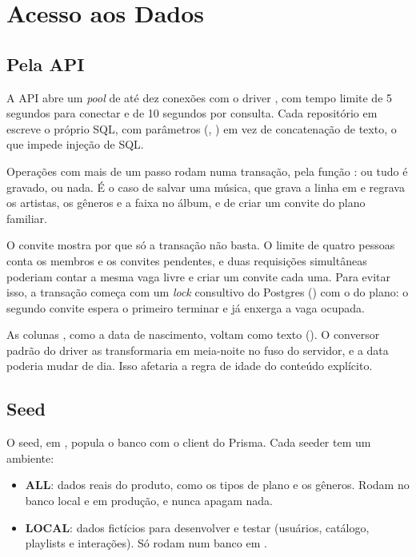 \section{Acesso aos Dados}
\label{sec:acesso}

\subsection{Pela API}

A API abre um \emph{pool} de até dez conexões com o driver , com
tempo limite de 5 segundos para conectar e de 10 segundos por
consulta. Cada repositório em  escreve o próprio SQL,
com parâmetros (, ) em vez de concatenação de texto, o
que impede injeção de SQL.

Operações com mais de um passo rodam numa transação, pela função
: ou tudo é gravado, ou nada. É o caso de salvar uma música,
que grava a linha em  e regrava os artistas, os gêneros e a faixa
no álbum, e de criar um convite do plano familiar.

O convite mostra por que só a transação não basta. O limite de quatro pessoas
conta os membros e os convites pendentes, e duas requisições simultâneas
poderiam contar a mesma vaga livre e criar um convite cada uma. Para evitar
isso, a transação começa com um \emph{lock} consultivo do Postgres
() com o  do plano: o segundo
convite espera o primeiro terminar e já enxerga a vaga ocupada.

As colunas , como a data de nascimento, voltam como texto
(). O conversor padrão do driver as transformaria em
meia-noite no fuso do servidor, e a data poderia mudar de dia. Isso afetaria
a regra de idade do conteúdo explícito.

\subsection{Seed}

O seed, em , popula o banco com o client do Prisma.
Cada seeder tem um ambiente:

\begin{itemize}
  \item \textbf{ALL}: dados reais do produto, como os tipos de plano e os
    gêneros. Rodam no banco local e em produção, e nunca apagam nada.
  \item \textbf{LOCAL}: dados fictícios para desenvolver e testar (usuários,
    catálogo, playlists e interações). Só rodam num banco em
    .
\end{itemize}


